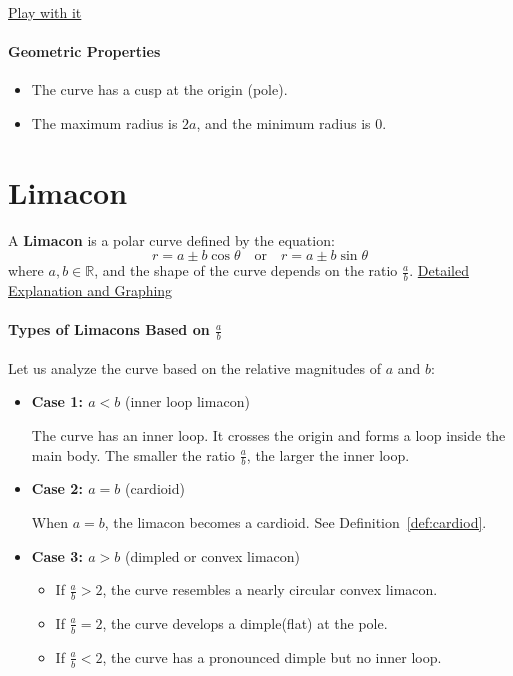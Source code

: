 \href{https://www.desmos.com/calculator/yp6lc5cj80}{Play with it}

\paragraph{Geometric Properties}
\begin{itemize}
  \item The curve has a cusp at the origin (pole).
  \item The maximum radius is $2a$, and the minimum radius is $0$.
\end{itemize}

\section{Limacon}
\label{sec:limacon}

\begin{definition}[Limacon]
  \label{def:limacon}
  A \textbf{Limacon} is a polar curve defined by the equation:
  \[
    r = a \pm b\cos\theta \quad \text{or} \quad r = a \pm b\sin\theta
  \]
  where \( a, b \in \mathbb{R} \), and the shape of the curve depends on the
  ratio \( \frac{a}{b} \).
  \href{https://youtu.be/5dEHo6FtG44?si=V77Po4mnSVCNeUrX}{Detailed Explanation
  and Graphing}
\end{definition}

\paragraph{Types of Limacons Based on \(\frac{a}{b}\)}
Let us analyze the curve based on the relative magnitudes of \( a \) and \( b \):

\begin{itemize}
  \item \textbf{Case 1: \( a < b \)} (inner loop limacon) 

    The curve has an inner loop. It crosses the origin and forms a loop inside the main body. The smaller the ratio \( \frac{a}{b} \), the larger the inner loop.

  \item \textbf{Case 2: \( a = b \)} (cardioid)

    When \( a = b \), the limacon becomes a cardioid. See Definition~\ref{def:cardiod}.

  \item \textbf{Case 3: \( a > b \)} (dimpled or convex limacon) 

    \begin{itemize}
      \item If \( \frac{a}{b} > 2 \), the curve resembles a nearly circular convex limacon.
      \item If \( \frac{a}{b} = 2 \), the curve develops a dimple(flat) at the pole.
      \item If \( \frac{a}{b} < 2 \), the curve has a pronounced dimple but no inner loop.
    \end{itemize}

\end{itemize}

